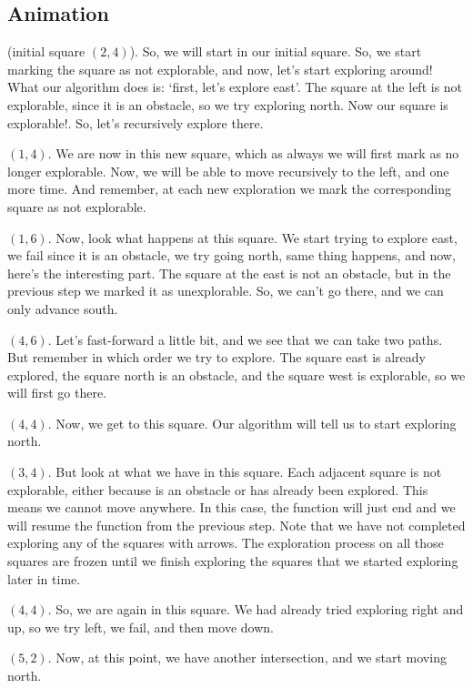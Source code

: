 \documentclass[12pt]{article}
\begin{document}
\subsection{Animation}

(initial square $(2, 4)$). So, we will start in our
initial square. So, we start marking the square as not
explorable, and now, let's start exploring around!
What our algorithm does is: `first, let's explore east'.
The square at the left is not explorable, since it is an obstacle,
so we try exploring north. Now our square is explorable!. So,
let's recursively explore there.

$(1, 4)$. We are now in this new square,
which as always we will first mark as no longer explorable.
Now, we will be able to move recursively to the left,
and one more time. And remember, at each new exploration we
mark the corresponding square as not explorable.

$(1, 6)$. Now, look what happens at this square. We start
trying to explore east, we fail since it is an obstacle,
we try going north, same thing happens, and now, here's
the interesting part. The square at the east is not an obstacle,
but in the previous step we marked it as unexplorable. So,
we can't go there, and we can only advance south.

$(4, 6)$. Let's fast-forward a little bit, and we see that we
can take two paths. But remember in which order we try to explore.
The square east is already explored, the square north is an
obstacle, and the square west is explorable, so we will
first go there.

$(4, 4)$. Now, we get to this square. Our algorithm will tell
us to start exploring north.

$(3, 4)$. But look at what we have in this square. Each adjacent
square is not explorable, either because is an obstacle or
has already been explored. This means we cannot move anywhere.
In this case, the function will just end and we will resume
the function from the previous step.
Note that we have not completed exploring any of the squares
with arrows. The exploration process on all those squares are
frozen until we finish exploring the squares that we started
exploring later in time.

$(4, 4)$. So, we are again in this square. We had already tried
exploring right and up, so we try left, we fail, and then move
down.

$(5, 2)$. Now, at this point, we have another intersection,
and we start moving north.
\end{document}
